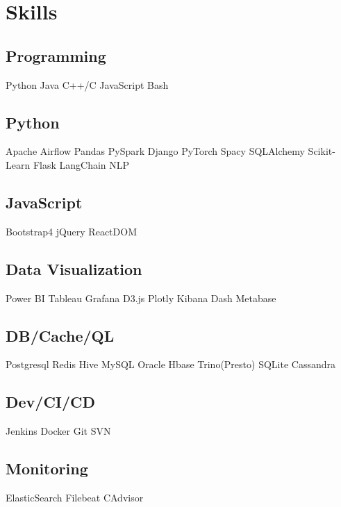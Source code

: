 \documentclass[]{Vishnu-Resume}
\begin{document}
\begin{minipage}[t]{0.33\textwidth}

\section{Skills}
\subsection{Programming}
Python \textbullet{} Java \textbullet{} C++/C  \textbullet{} JavaScript \textbullet{} Bash
\sectionsep

\subsection{Python}
Apache Airflow \textbullet{} Pandas \textbullet{} PySpark  \textbullet{} Django \textbullet{} PyTorch  \textbullet{} Spacy   \textbullet{} SQLAlchemy  \textbullet{} Scikit-Learn \textbullet{} Flask  \textbullet{} LangChain  \textbullet{} NLP
\sectionsep

\subsection{JavaScript}
Bootstrap4 \textbullet{} jQuery \textbullet{} ReactDOM 
\sectionsep

\subsection{Data Visualization}
Power BI \textbullet{} Tableau \textbullet{} Grafana \textbullet{} D3.js  \textbullet{} Plotly \textbullet{} Kibana \textbullet{} Dash \textbullet{} Metabase
\sectionsep

\subsection{DB/Cache/QL}
 Postgresql  \textbullet{} Redis  \textbullet{} Hive  \textbullet{} MySQL  \textbullet{} Oracle  \textbullet{} Hbase  \textbullet{} Trino(Presto)  \textbullet{} SQLite \textbullet{} Cassandra
\sectionsep

\subsection{Dev/CI/CD}
Jenkins \textbullet{} Docker \textbullet{} Git \textbullet{} SVN
\sectionsep


\subsection{Monitoring}
ElasticSearch \textbullet{} Filebeat \textbullet{} CAdvisor
\sectionsep


\end{minipage}
\end{document}
